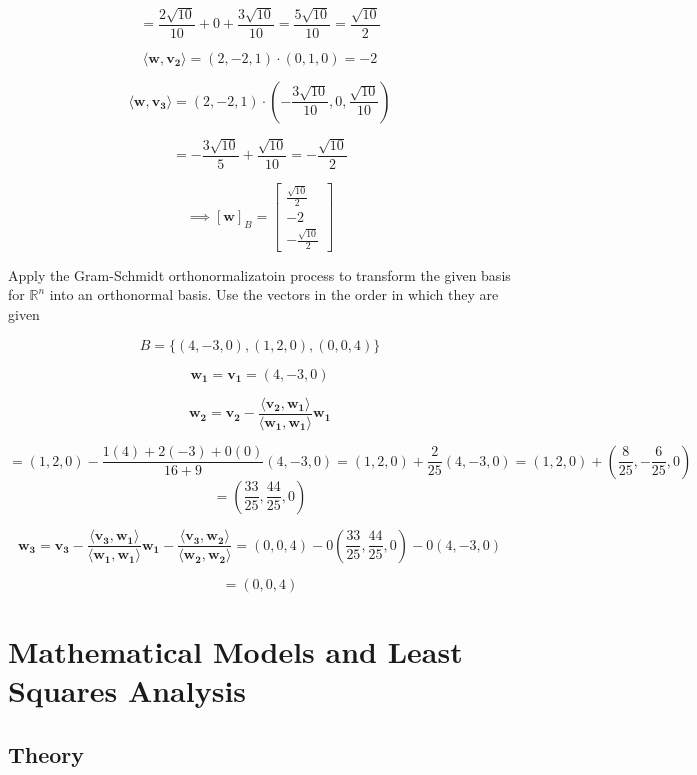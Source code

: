 \documentclass{report}
\begin{document}
$$
= \frac{2\sqrt{10}}{10} + 0 + \frac{3\sqrt{10}}{10} = \frac{5\sqrt{10}}{10} = \boxed{\frac{\sqrt{10}}{2}}
$$

$$
\langle \bm{w}, \bm{v_2} \rangle = (2,-2,1) \cdot (0,1,0) = \boxed{-2}
$$

$$
\langle \bm{w}, \bm{v_3} \rangle = (2,-2,1) \cdot \left( -\frac{3\sqrt{10}}{10}, 0, \frac{\sqrt{10}}{10} \right)
$$

$$
= -\frac{3\sqrt{10}}{5} + \frac{\sqrt{10}}{10} =\boxed{ -\frac{\sqrt{10}}{2}}
$$

$$
\implies [\bm{w}]_B = \begin{bmatrix} \frac{\sqrt{10}}{2} \\ -2 \\  -\frac{\sqrt{10}}{2} \end{bmatrix} 
$$

\begin{tcolorbox}[colframe = lightred]
	Apply the Gram-Schmidt orthonormalizatoin process to transform the given basis for $\mathbb{R}^n$ into an orthonormal basis. Use the vectors in the order in which they are given
	
	$$
	B = \{(4,-3,0), (1,2,0), (0,0,4)\}
	$$
	
\end{tcolorbox}

$$
\bm{w_1} = \bm{v_1} = (4,-3,0)
$$

$$
\bm{w_2} = \bm{v_2} - \frac{\langle \bm{v_2}, \bm{w_1} \rangle}{\langle \bm{w_1}, \bm{w_1} \rangle}\bm{w_1} 
$$

$$
= (1,2,0) - \frac{1(4) + 2(-3) + 0(0)}{16+9} (4,-3,0) = (1,2,0) + \frac{2}{25} (4,-3,0) = (1,2,0) + \left(\frac{8}{25}, - \frac{6}{25}, 0 \right)
$$
$$
= \left( \frac{33}{25}, \frac{44}{25}, 0 \right)
$$

$$\bm{w_3} = \bm{v_3} - \frac{\langle \bm{v_3}, \bm{w_1} \rangle}{\langle \bm{w_1}, \bm{w_1} \rangle}  \bm{w_1}  - \frac{\langle \bm{v_3}, \bm{w_2} \rangle}{\langle \bm{w_2}, \bm{w_2} \rangle} = (0,0,4) - 0\left(\frac{33}{25}, \frac{44}{25}, 0 \right) - 0(4,-3,0)
$$

$$
=(0,0,4)
$$

\section{Mathematical Models and Least Squares Analysis}

\subsection{Theory}
\end{document}
